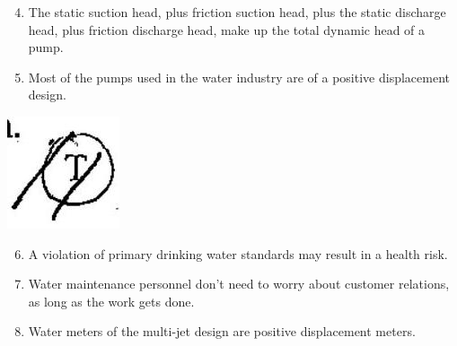 \documentclass[10pt]{article}
\begin{document}
\begin{enumerate}
  \setcounter{enumi}{3}
  \item The static suction head, plus friction suction head, plus the static discharge head, plus friction discharge head, make up the total dynamic head of a pump.

  \item Most of the pumps used in the water industry are of a positive displacement design.

\end{enumerate}

\includegraphics[max width=\textwidth]{2022_11_11_a5e8a54031fc138b833ag-1(3)}

\begin{enumerate}
  \setcounter{enumi}{5}
  \item A violation of primary drinking water standards may result in a health risk.

  \item Water maintenance personnel don't need to worry about customer relations, as long as the work gets done.

  \item Water meters of the multi-jet design are positive displacement meters.

\end{enumerate}
\end{document}
